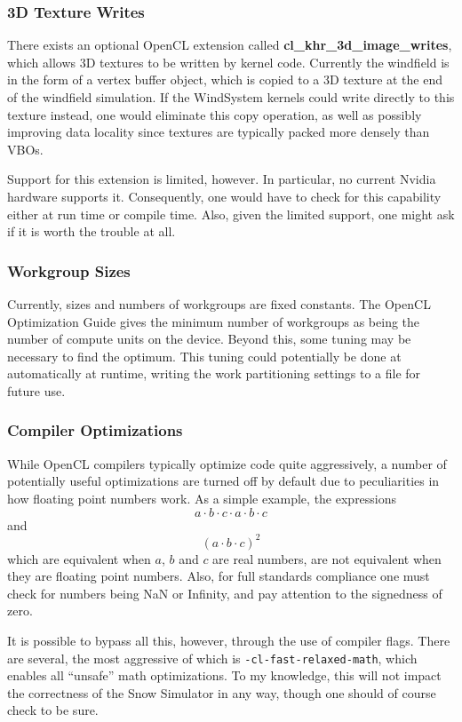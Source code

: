 \subsubsection*{3D Texture Writes}
There exists an optional OpenCL extension called \textbf{cl\_khr\_3d\_image\_writes}, which allows 3D textures to be written by kernel code. Currently the windfield is in the form of a vertex buffer object, which is copied to a 3D texture at the end of the windfield simulation. If the WindSystem kernels could write directly to this texture instead, one would eliminate this copy operation, as well as possibly improving data locality since textures are typically packed more densely than VBOs.

Support for this extension is limited, however. In particular, no current Nvidia hardware supports it. Consequently, one would have to check for this capability either at run time or compile time. Also, given the limited support, one might ask if it is worth the trouble at all.

\subsubsection*{Workgroup Sizes}
Currently, sizes and numbers of workgroups are fixed constants. The OpenCL Optimization Guide \citep{amd2014opencl} gives the minimum number of workgroups as being the number of compute units on the device. Beyond this, some tuning may be necessary to find the optimum. This tuning could potentially be done at automatically at runtime, writing the work partitioning settings to a file for future use.

\subsubsection*{Compiler Optimizations}
While OpenCL compilers typically optimize code quite aggressively, a number of potentially useful optimizations are turned off by default due to peculiarities in how floating point numbers work. As a simple example, the expressions 
\begin{equation*}
a \cdot b \cdot c \cdot a \cdot b \cdot c
\end{equation*}
and
\begin{equation*}
(a \cdot b \cdot c) ^ 2
\end{equation*}
which are equivalent when $a$, $b$ and $c$ are real numbers, are not equivalent when they are floating point numbers. Also, for full standards compliance one must check for numbers being NaN or Infinity, and pay attention to the signedness of zero.

It is possible to bypass all this, however, through the use of compiler flags. There are several, the most aggressive of which is \texttt{-cl-fast-relaxed-math}, which enables all ``unsafe'' math optimizations. To my knowledge, this will not impact the correctness of the Snow Simulator in any way, though one should of course check to be sure. 